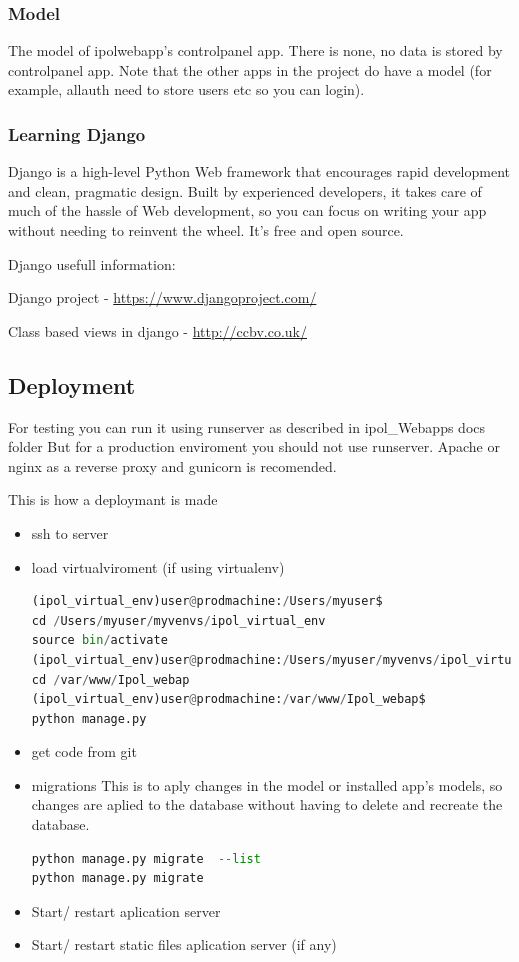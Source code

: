 \subsubsection{Model}
The model of ipolwebapp's controlpanel app.
There is none, no data is stored by controlpanel app.
Note that the other apps in the project do have a model (for example, allauth need to store users etc so you can login).


\subsubsection{Learning Django}
Django is a high-level Python Web framework that encourages rapid development and clean, pragmatic design. Built by experienced developers, it takes care of much of the hassle of Web development, so you can focus on writing your app without needing to reinvent the wheel. It’s free and open source.

Django usefull information:

Django project - \url{https://www.djangoproject.com/}

Class based views in django - \url{http://ccbv.co.uk/}

\subsection{Deployment}
For testing you can run it using runserver as described in ipol\_Webapps docs folder
But for a production enviroment you should not use runserver. Apache or nginx as a reverse proxy and gunicorn is recomended.

This is how a deploymant is made

\begin{itemize}
\item  ssh to server 
\item  load virtualviroment (if using virtualenv)
\begin{lstlisting}[language=Python,firstnumber=1]
(ipol_virtual_env)user@prodmachine:/Users/myuser$
cd /Users/myuser/myvenvs/ipol_virtual_env
source bin/activate
(ipol_virtual_env)user@prodmachine:/Users/myuser/myvenvs/ipol_virtual_env$
cd /var/www/Ipol_webap
(ipol_virtual_env)user@prodmachine:/var/www/Ipol_webap$ 
python manage.py 
\end{lstlisting}
\item  get code from git
\item  migrations
This is to aply changes in the model or installed app's models, so changes are aplied to the database without having to delete and recreate the database.
\begin{lstlisting}[language=Python,firstnumber=1]
python manage.py migrate  --list
python manage.py migrate
\end{lstlisting}
\item  Start/ restart aplication server
\item  Start/ restart static files aplication server (if any)

\end{itemize}




